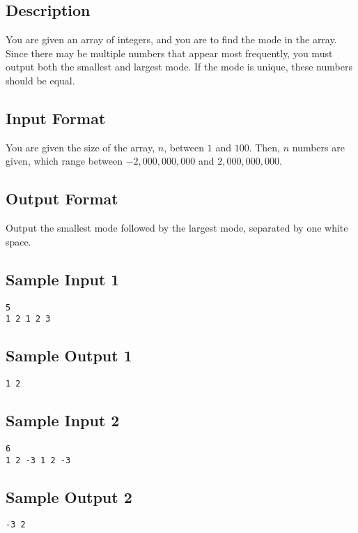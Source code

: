 \subsection*{Description}
You are given an array of integers, and you are to find the mode in the array.  Since there may be multiple numbers that appear most frequently, you must output both the smallest and largest mode.  If the mode is unique, these numbers should be equal.

\subsection*{Input Format}
You are given the size of the array, $n$, between $1$ and $100$. 
Then, $n$ numbers are given, which range between $-2,000,000,000$ and $2,000,000,000$. 

\subsection*{Output Format}
Output the smallest mode followed by the largest mode, separated by one white space.

\subsection*{Sample Input 1}
\begin{verbatim}
5
1 2 1 2 3
\end{verbatim}

\subsection*{Sample Output 1}
\begin{verbatim}
1 2
\end{verbatim}

\subsection*{Sample Input 2}
\begin{verbatim}
6
1 2 -3 1 2 -3
\end{verbatim}

\subsection*{Sample Output 2}
\begin{verbatim}
-3 2
\end{verbatim}



